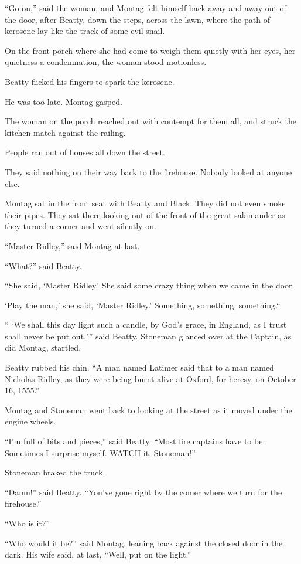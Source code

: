 \documentclass[11pt,openany]{book}
\begin{document}
``Go on,'' said the woman, and Montag felt himself back away and away out of the door, after Beatty, down the steps, across the lawn, where the path of kerosene lay like the track of some evil snail.

On the front porch where she had come to weigh them quietly with her eyes, her quietness a condemnation, the woman stood motionless.

Beatty flicked his fingers to spark the kerosene.

He was too late. Montag gasped.

The woman on the porch reached out with contempt for them all, and struck the kitchen match against the railing.

People ran out of houses all down the street.

They said nothing on their way back to the firehouse. Nobody looked at anyone else.

Montag sat in the front seat with Beatty and Black. They did not even smoke their pipes. They sat there looking out of the front of the great salamander as they turned a corner and went silently on.

``Master Ridley,'' said Montag at last.

``What?'' said Beatty.

``She said, `Master Ridley.' She said some crazy thing when we came in the door.

`Play the man,' she said, `Master Ridley.' Something, something, something.``

`` `We shall this day light such a candle, by God's grace, in England, as I trust shall never be put out,''' said Beatty. Stoneman glanced over at the Captain, as did Montag, startled.

Beatty rubbed his chin. ``A man named Latimer said that to a man named Nicholas Ridley, as they were being burnt alive at Oxford, for heresy, on October 16, 1555.''

Montag and Stoneman went back to looking at the street as it moved under the engine wheels.

``I'm full of bits and pieces,'' said Beatty. ``Most fire captains have to be. Sometimes I surprise myself. WATCH it, Stoneman!''

Stoneman braked the truck.

``Damn!'' said Beatty. ``You've gone right by the comer where we turn for the firehouse.''

``Who is it?''

``Who would it be?'' said Montag, leaning back against the closed door in the dark. His wife said, at last, ``Well, put on the light.''
\end{document}

